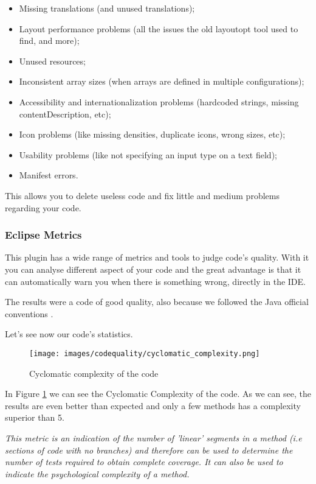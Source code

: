 \begin{itemize}
\item Missing translations (and unused translations);
\item Layout performance problems (all the issues the old layoutopt tool used to find, and more);
\item Unused resources;
\item Inconsistent array sizes (when arrays are defined in multiple configurations);
\item Accessibility and internationalization problems (hardcoded strings, missing contentDescription, etc);
\item Icon problems (like missing densities, duplicate icons, wrong sizes, etc);
\item Usability problems (like not specifying an input type on a text field);
\item Manifest errors.
\end{itemize}

This allows you to delete useless code and fix little and medium problems regarding your code.

\subsubsection{Eclipse Metrics}

This plugin has a wide range of metrics and tools to judge code's quality. With it you can analyse different aspect of your code and the great advantage is that it can automatically warn you when there is something wrong, directly in the IDE.

The results were a code of good quality, also because we followed the Java official conventions \cite{website:javacodeconventions}.

Let's see now our code's statistics.

\begin{figure}[H]
\centering %
\texttt{[image: images/codequality/cyclomatic\_complexity.png]}
\caption{Cyclomatic complexity of the code}
\label{fig:cyclomaticComplexity}
\end{figure}

In Figure \ref{fig:cyclomaticComplexity} we can see the Cyclomatic Complexity of the code. As we can see, the results are even better than expected and only a few methods has a complexity superior than 5.

\textit{This metric is an indication of the number of 'linear' segments in a method (i.e sections of code with no branches) and therefore can be used to determine the number of tests required to obtain complete coverage. It can also be used to indicate the psychological complexity of a method.}\cite{website:eclipse-metrics}

